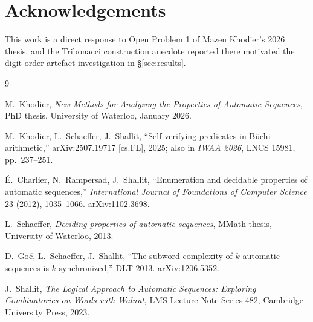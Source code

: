 \documentclass[11pt]{article}
\begin{document}
\section*{Acknowledgements}
This work is a direct response to Open Problem 1 of Mazen Khodier's 2026 thesis, and the
Tribonacci construction anecdote reported there motivated the digit-order-artefact
investigation in \S\ref{sec:results}.

\begin{thebibliography}{9}

M.\ Khodier, \emph{New Methods for Analyzing the Properties of Automatic Sequences},
PhD thesis, University of Waterloo, January 2026.

M.\ Khodier, L.\ Schaeffer, J.\ Shallit, ``Self-verifying predicates in B\"uchi
arithmetic,'' arXiv:2507.19717 [cs.FL], 2025; also in \emph{IWAA 2026}, LNCS 15981,
pp.\ 237--251.

\'E.\ Charlier, N.\ Rampersad, J.\ Shallit, ``Enumeration and decidable properties of
automatic sequences,'' \emph{International Journal of Foundations of Computer Science}
23 (2012), 1035--1066. arXiv:1102.3698.

L.\ Schaeffer, \emph{Deciding properties of automatic sequences}, MMath thesis,
University of Waterloo, 2013.

D.\ Go\v{c}, L.\ Schaeffer, J.\ Shallit, ``The subword complexity of $k$-automatic
sequences is $k$-synchronized,'' DLT 2013. arXiv:1206.5352.

J.\ Shallit, \emph{The Logical Approach to Automatic Sequences: Exploring
Combinatorics on Words with Walnut}, LMS Lecture Note Series 482, Cambridge University
Press, 2023.

\end{thebibliography}
\end{document}
